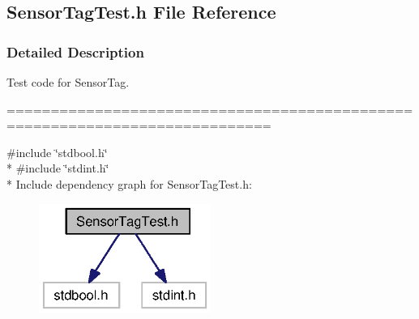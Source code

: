 \subsection{Sensor\+Tag\+Test.\+h File Reference}
\label{_sensor_tag_test_8h}


\subsubsection{Detailed Description}
Test code for Sensor\+Tag. 

============================================================================



{\ttfamily \#include \char`\"{}stdbool.\+h\char`\"{}}\\*
{\ttfamily \#include \char`\"{}stdint.\+h\char`\"{}}\\*
Include dependency graph for Sensor\+Tag\+Test.\+h\+:
\nopagebreak
\begin{figure}[H]
\begin{center}
\leavevmode
\includegraphics[width=159pt]{_sensor_tag_test_8h__incl}
\end{center}
\end{figure}
